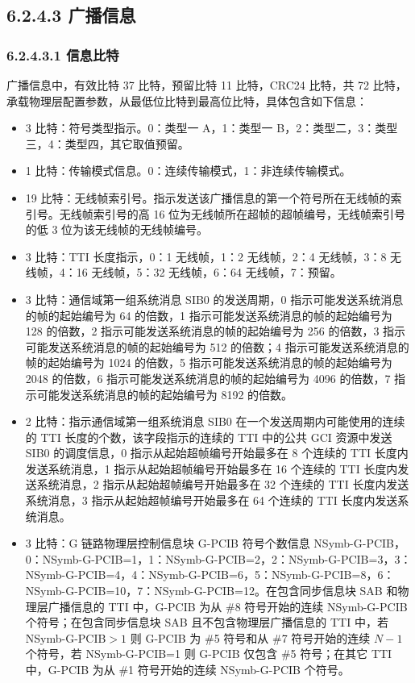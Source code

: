 \documentclass[11pt,a4paper]{ctexart}
\begin{document}
\subsection{6.2.4.3 广播信息}

\subsubsection{6.2.4.3.1 信息比特}

广播信息中，有效比特 37 比特，预留比特 11 比特，CRC24 比特，共 72 比特，承载物理层配置参数，从最低位比特到最高位比特，具体包含如下信息：
\begin{itemize}[nosep]
  \item 3 比特：符号类型指示。0：类型一 A，1：类型一 B，2：类型二，3：类型三，4：类型四，其它取值预留。
  \item 1 比特：传输模式信息。0：连续传输模式，1：非连续传输模式。
  \item 19 比特：无线帧索引号。指示发送该广播信息的第一个符号所在无线帧的索引号。无线帧索引号的高 16 位为无线帧所在超帧的超帧编号，无线帧索引号的低 3 位为该无线帧的无线帧编号。
  \item 3 比特：TTI 长度指示，0：1 无线帧，1：2 无线帧，2：4 无线帧，3：8 无线帧，4：16 无线帧，5：32 无线帧，6：64 无线帧，7：预留。
  \item 3 比特：通信域第一组系统消息 SIB0 的发送周期，0 指示可能发送系统消息的帧的起始编号为 64 的倍数，1 指示可能发送系统消息的帧的起始编号为 128 的倍数，2 指示可能发送系统消息的帧的起始编号为 256 的倍数，3 指示可能发送系统消息的帧的起始编号为 512 的倍数；4 指示可能发送系统消息的帧的起始编号为 1024 的倍数，5 指示可能发送系统消息的帧的起始编号为 2048 的倍数，6 指示可能发送系统消息的帧的起始编号为 4096 的倍数，7 指示可能发送系统消息的帧的起始编号为 8192 的倍数。
  \item 2 比特：指示通信域第一组系统消息 SIB0 在一个发送周期内可能使用的连续的 TTI 长度的个数，该字段指示的连续的 TTI 中的公共 GCI 资源中发送 SIB0 的调度信息，0 指示从起始超帧编号开始最多在 8 个连续的 TTI 长度内发送系统消息，1 指示从起始超帧编号开始最多在 16 个连续的 TTI 长度内发送系统消息，2 指示从起始超帧编号开始最多在 32 个连续的 TTI 长度内发送系统消息，3 指示从起始超帧编号开始最多在 64 个连续的 TTI 长度内发送系统消息。
  \item 3 比特：G 链路物理层控制信息块 G-PCIB 符号个数信息 NSymb-G-PCIB，0：NSymb-G-PCIB=1，1：NSymb-G-PCIB=2，2：NSymb-G-PCIB=3，3：NSymb-G-PCIB=4，4：NSymb-G-PCIB=6，5：NSymb-G-PCIB=8，6：NSymb-G-PCIB=10，7：NSymb-G-PCIB=12。在包含同步信息块 SAB 和物理层广播信息的 TTI 中，G-PCIB 为从 \#8 符号开始的连续 NSymb-G-PCIB 个符号；在包含同步信息块 SAB 且不包含物理层广播信息的 TTI 中，若 NSymb-G-PCIB$>1$ 则 G-PCIB 为 \#5 符号和从 \#7 符号开始的连续 $N-1$ 个符号，若 NSymb-G-PCIB=1 则 G-PCIB 仅包含 \#5 符号；在其它 TTI 中，G-PCIB 为从 \#1 符号开始的连续 NSymb-G-PCIB 个符号。

\end{itemize}
\end{document}
